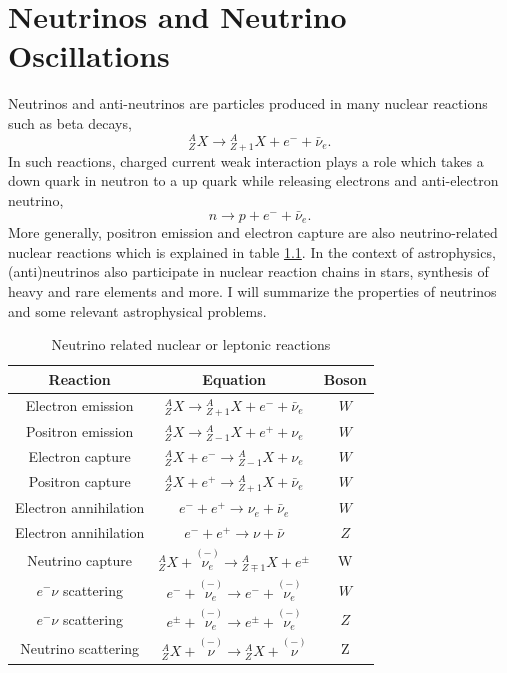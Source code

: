 

\chapter{\label{chap:basics}Neutrinos and Neutrino Oscillations}




Neutrinos and anti-neutrinos are particles produced in many nuclear reactions such as beta decays,
\begin{equation}
{}^A_Z X \to {}_{Z+1}^AX + e^- +\bar \nu_e .
\end{equation}
In such reactions, charged current weak interaction plays a role which takes a down quark in neutron to a up quark while releasing electrons and anti-electron neutrino,
\begin{equation}
n\to p + e^- + \bar \nu_e .
\end{equation}
More generally, positron emission and electron capture are also neutrino-related nuclear reactions which is explained in table \ref{table:Neutrino_Reactions}. In the context of astrophysics, (anti)neutrinos also participate in nuclear reaction chains in stars, synthesis of heavy and rare elements and more. I will summarize the properties of neutrinos and some relevant astrophysical problems.

\begin{table}[ht]
\centering
 \begin{tabular}{|c | c | c|} 
 \hline
 Reaction & Equation & Boson   \\ [0.5ex] 
 \hline
 Electron emission & ${}^A_Z X \to {}^A_{Z+1}X + e^- +\bar \nu_e$ & $W$  \\ 
 Positron emission & ${}^A_Z X \to {}^A_{Z-1}X + e^+ + \nu_e$ & $W$  \\
 Electron capture & ${}^A_Z X + e^- \to {}^A_{Z-1}X  + \nu_e$ &  $W$ \\
 Positron capture & ${}^A_Z X + e^+ \to {}^A_{Z+1}X  + \bar\nu_e$ &  $W$ \\
 [0.5ex] 
 \hline

 Electron annihilation &  $e^- + e^+  \to \nu_e + \bar\nu_e $  & $W$ \\
 Electron annihilation &  $e^- + e^+  \to \nu + \bar\nu $  & $Z$ \\
 [0.5ex] 
 \hline

  Neutrino capture & ${}^A_{Z}X + \overset{(-)}{\nu_e} \to {}^A_{Z\mp 1}X + e^\pm $ & W\\
  [1ex] 
 \hline
 $e^-\nu$ scattering & $e^- + \overset{(-)}{\nu_e} \to e^- + \overset{(-)}{\nu_e} $ &  $W$ \\
 $e^-\nu$ scattering & $e^{\pm} + \overset{(-)}{\nu_e} \to e^{\pm} + \overset{(-)}{\nu_e} $ &  $Z$ \\
 Neutrino scattering & $ {}^A_Z X + \overset{(-)}{\nu} \to {}^A_Z X + \overset{(-)}{\nu} $ &  Z\\
 [0.5ex] 
 \hline
 \end{tabular}
 \caption{Neutrino related nuclear or leptonic reactions}
\label{table:Neutrino_Reactions}
\end{table}


